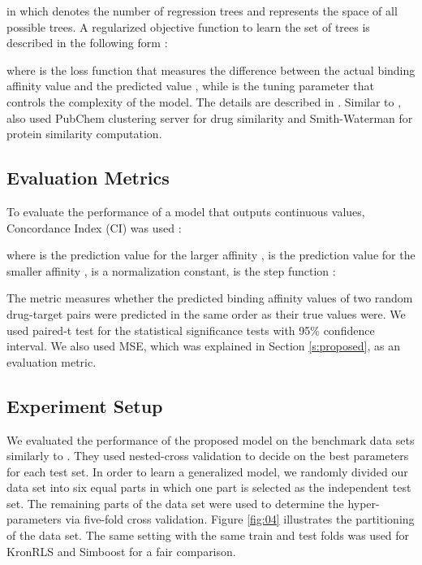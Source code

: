 \documentclass[11pt,letterpaper]{article}
\begin{document}
in which  denotes the number of regression trees and  represents the space of all possible trees.  A regularized objective function to learn the set of trees  is described in the following form \cite{he2017simboost}:

where  is the loss function that measures the difference between the actual binding affinity value  and the predicted value , while  is the tuning parameter that controls the complexity of the model. The details are described in \cite{he2017simboost,chen2015higgs,chen2016xgboost}. Similar to  \cite{pahikkala2014toward}, \cite{he2017simboost} also used PubChem clustering server for drug similarity and Smith-Waterman for protein similarity computation.


\subsection*{Evaluation Metrics}

To evaluate the performance of a model that outputs continuous values, Concordance Index (CI) was used \cite{gonen2005concordance}:

where  is the prediction value for the larger affinity ,  is the prediction value for the smaller affinity ,  is a normalization constant,  is the step function \cite{pahikkala2014toward}:

The metric measures whether the predicted binding affinity values of two random drug-target pairs were predicted in the same order as their true values were. We used paired-t test for the statistical significance tests with 95\% confidence interval. We also used MSE, which was explained in Section \ref{s:proposed}, as an evaluation metric.


\subsection*{Experiment Setup}

We evaluated the performance of the proposed model on the benchmark data sets \cite{davis2011comprehensive,tang2014making} similarly to \cite{he2017simboost}. They used nested-cross validation to decide on the best parameters for each test set. In order to learn a generalized model, we randomly divided our data set into six equal parts in which one part is selected as the independent test set. The remaining parts of the data set were used to determine the hyper-parameters via five-fold cross validation. Figure \ref{fig:04} illustrates the partitioning of the data set. The same setting with the same train and test folds was used for  KronRLS \cite{pahikkala2014toward} and Simboost \cite{he2017simboost} for a fair comparison.
\end{document}
